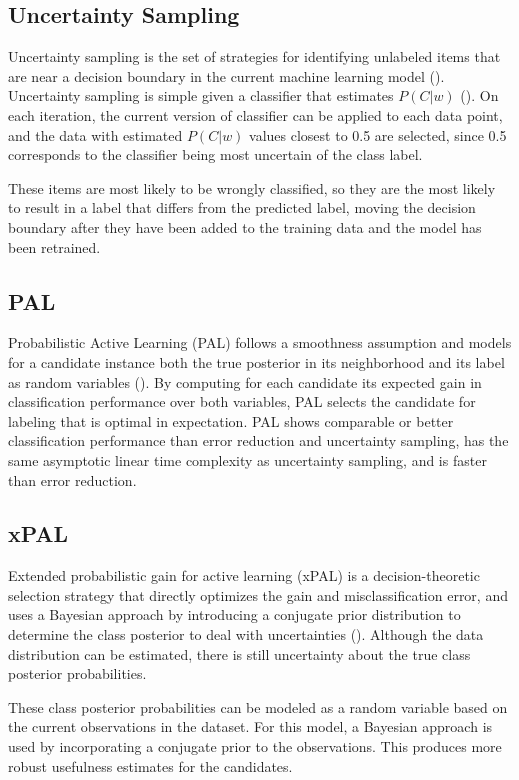 \subsection{Uncertainty Sampling}
Uncertainty sampling is the set of strategies for identifying unlabeled items that are near a decision boundary in the current machine learning model (\cite{munro2021human}). Uncertainty sampling is simple given a classifier that estimates $P (C|w)$ (\cite{lewis1994uncertainty}). On each iteration, the current version of classifier can be applied to each data point, and the data with estimated $P(C|w)$ values closest to 0.5 are selected, since 0.5 corresponds to the classifier being most uncertain of the class label.

These items are most likely to be wrongly classified, so they are the most likely to result in a label that differs from the predicted label, moving the decision boundary after they have been added to the training data and the model has been retrained.

\subsection{PAL}
Probabilistic Active Learning (PAL) follows a smoothness assumption and models for a candidate instance both the true posterior in its neighborhood and its label as random variables (\cite{kottke2014pal}). By computing for each candidate its expected gain in classification performance over both variables, PAL selects the candidate for labeling that is optimal in expectation. PAL shows comparable or better classification performance than error reduction and uncertainty sampling, has the same asymptotic linear time complexity as uncertainty sampling, and is faster than error reduction.

\subsection{xPAL}
Extended probabilistic gain for active learning (xPAL) is a decision-theoretic selection strategy that directly optimizes the gain and misclassification error, and uses a Bayesian approach by introducing a conjugate prior distribution to determine the class posterior to deal with uncertainties (\cite{kottke2021toward}). Although the data distribution can be estimated, there is still uncertainty about the true class posterior probabilities. 

These class posterior probabilities can be modeled as a random variable based on the current observations in the dataset. For this model, a Bayesian approach is used by incorporating a conjugate prior to the observations. This produces more robust usefulness estimates for the candidates.

